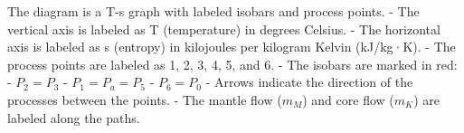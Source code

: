 The diagram is a T-s graph with labeled isobars and process points.  
- The vertical axis is labeled as T (temperature) in degrees Celsius.  
- The horizontal axis is labeled as s (entropy) in kilojoules per kilogram Kelvin (kJ/kg·K).  
- The process points are labeled as 1, 2, 3, 4, 5, and 6.  
- The isobars are marked in red:  
  - \( P_2 = P_3 \)  
  - \( P_1 = P_a = P_5 \)  
  - \( P_6 = P_0 \)  
- Arrows indicate the direction of the processes between the points.  
- The mantle flow (\( m_M \)) and core flow (\( m_K \)) are labeled along the paths.